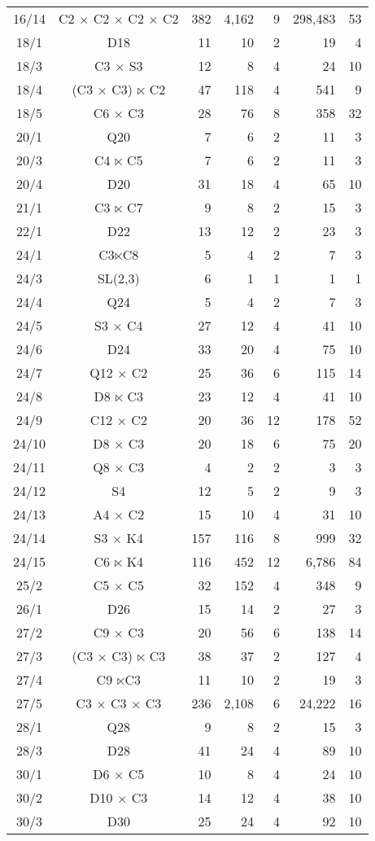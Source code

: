 \documentclass[a4paper,11pt]{article}
\theoremstyle{plain}
\theoremstyle{definition}
\begin{document}
\begin{longtable}{ccrrrrr}
	16/14 & C2 $\times$ C2 $\times$ C2 $\times$ C2 
	          & 382 & 4,162 & 9 & 298,483 & 53  \\ 
	18/1 & D18 & 11 & 10 & 2 & 19 & 4 \\ 
	18/3 & C3 $\times$ S3 & 12 & 8 & 4 & 24 & 10 \\ 
	18/4 & (C3 $\times$ C3) $\ltimes$ C2 & 47 & 118 & 4 & 541 & 9 \\ 
	18/5 & C6 $\times$ C3 & 28 & 76 & 8 & 358 & 32 \\ 
	20/1 & Q20 & 7 & 6 & 2 & 11 & 3 \\ 
	20/3 & C4 $\ltimes$ C5 & 7 & 6 & 2 & 11 & 3 \\ 
	20/4 & D20 & 31 & 18 & 4 & 65 & 10 \\ 
	21/1 & C3 $\ltimes$ C7 & 9 & 8 & 2 & 15 & 3 \\ 
	22/1 & D22 & 13 & 12 & 2 & 23 & 3 \\ 
	24/1 & C3$\ltimes$C8 & 5 & 4 & 2 & 7 & 3 \\ 
	24/3 & SL(2,3) & 6 & 1 & 1 & 1 & 1 \\ 
	24/4 & Q24 & 5 & 4 & 2 & 7 & 3 \\ 
	24/5 & S3 $\times$ C4 & 27 & 12 & 4 & 41 & 10 \\ 
	24/6 & D24 & 33 & 20 & 4 & 75 & 10 \\ 
	24/7 & Q12 $\times$ C2 & 25 & 36 & 6 & 115 & 14 \\ 
	24/8 & D8 $\ltimes$ C3 & 23 & 12 & 4 & 41 & 10 \\ 
	24/9 & C12 $\times$ C2 & 20 & 36 & 12 & 178 & 52 \\ 
	24/10 & D8 $\times$ C3 & 20 & 18 & 6 & 75 & 20 \\ 
	24/11 & Q8 $\times$ C3 & 4 & 2 & 2 & 3 & 3 \\ 
	24/12 & S4 & 12 & 5 & 2 & 9 & 3 \\ 
	24/13 & A4 $\times$ C2 & 15 & 10 & 4 & 31 & 10 \\ 
	24/14 & S3 $\times$ K4 & 157 & 116 & 8 & 999 & 32 \\ 
	24/15 & C6 $\ltimes$ K4 & 116 & 452 & 12 & 6,786 & 84 \\ 
	25/2 & C5 $\times$ C5 & 32 & 152 & 4 & 348 & 9 \\ 
	26/1 & D26 & 15 & 14 & 2 & 27 & 3 \\ 
	27/2 & C9 $\times$ C3 & 20 & 56 & 6 & 138 & 14 \\ 
	27/3 & (C3 $\times$ C3) $\ltimes$ C3 & 38 & 37 & 2 & 127 & 4 \\ 
	27/4 & C9 $\ltimes$C3 & 11 & 10 & 2 & 19 & 3 \\ 
	27/5 & C3 $\times$ C3 $\times$ C3 & 236 & 2,108 & 6 & 24,222  & 16 \\ 
	28/1 & Q28 & 9 & 8 & 2 & 15 & 3 \\ 
	28/3 & D28 & 41 & 24 & 4 & 89 & 10 \\ 
	30/1 & D6 $\times$ C5 & 10 & 8 & 4 & 24 & 10 \\ 
	30/2 & D10 $\times$ C3 & 14 & 12 & 4 & 38 & 10 \\ 
	30/3 & D30 & 25 & 24 & 4 & 92 & 10 \\ \hline
\end{longtable}
\end{document}
